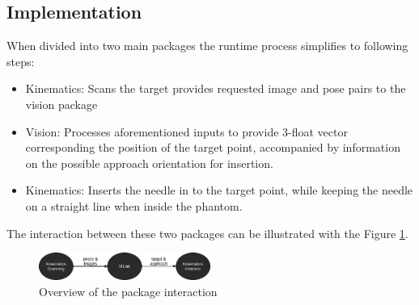 \subsection{Implementation}
When divided into two main packages the runtime process simplifies to following steps:
\begin{itemize}
    \item Kinematics: Scans the target provides requested image and pose pairs to the vision package
    \item Vision: Processes aforementioned inputs to provide 3-float vector corresponding the position of the target point, accompanied by information on the possible approach orientation for insertion.
    \item Kinematics: Inserts the needle in to the target point, while keeping the needle on a straight line when inside the phantom.
\end{itemize}

The interaction between these two packages can be illustrated with the Figure \ref{overview}.

\begin{figure}
    \label{overview}
    \caption{Overview of the package interaction}
    \includegraphics[width=0.5\textwidth]{images/overview}
\end{figure}


